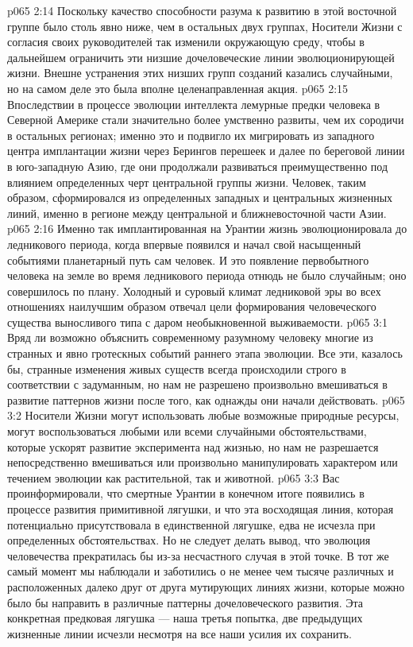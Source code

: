\vs p065 2:14 Поскольку качество способности разума к развитию в этой восточной группе было столь явно ниже, чем в остальных двух группах, Носители Жизни с согласия своих руководителей так изменили окружающую среду, чтобы в дальнейшем ограничить эти низшие дочеловеческие линии эволюционирующей жизни. Внешне устранения этих низших групп созданий казались случайными, но на самом деле это была вполне целенаправленная акция.
\vs p065 2:15 Впоследствии в процессе эволюции интеллекта лемурные предки человека в Северной Америке стали значительно более умственно развиты, чем их сородичи в остальных регионах; именно это и подвигло их мигрировать из западного центра имплантации жизни через Берингов перешеек и далее по береговой линии в юго\hyp{}западную Азию, где они продолжали развиваться преимущественно под влиянием определенных черт центральной группы жизни. Человек, таким образом, сформировался из определенных западных и центральных жизненных линий, именно в регионе между центральной и ближневосточной части Азии.
\vs p065 2:16 Именно так имплантированная на Урантии жизнь эволюционировала до ледникового периода, когда впервые появился и начал свой насыщенный событиями планетарный путь сам человек. И это появление первобытного человека на земле во время ледникового периода отнюдь не было случайным; оно совершилось по плану. Холодный и суровый климат ледниковой эры во всех отношениях наилучшим образом отвечал цели формирования человеческого существа выносливого типа с даром необыкновенной выживаемости.
\vs p065 3:1 Вряд ли возможно объяснить современному разумному человеку многие из странных и явно гротескных событий раннего этапа эволюции. Все эти, казалось бы, странные изменения живых существ всегда происходили строго в соответствии с задуманным, но нам не разрешено произвольно вмешиваться в развитие паттернов жизни после того, как однажды они начали действовать.
\vs p065 3:2 \pc Носители Жизни могут использовать любые возможные природные ресурсы, могут воспользоваться любыми или всеми случайными обстоятельствами, которые ускорят развитие эксперимента над жизнью, но нам не разрешается непосредственно вмешиваться или произвольно манипулировать характером или течением эволюции как растительной, так и животной.
\vs p065 3:3 Вас проинформировали, что смертные Урантии в конечном итоге появились в процессе развития примитивной лягушки, и что эта восходящая линия, которая потенциально присутствовала в единственной лягушке, едва не исчезла при определенных обстоятельствах. Но не следует делать вывод, что эволюция человечества прекратилась бы из\hyp{}за несчастного случая в этой точке. В тот же самый момент мы наблюдали и заботились о не менее чем тысяче различных и расположенных далеко друг от друга мутирующих линиях жизни, которые можно было бы направить в различные паттерны дочеловеческого развития. Эта конкретная предковая лягушка --- наша третья попытка, две предыдущих жизненные линии исчезли несмотря на все наши усилия их сохранить.

